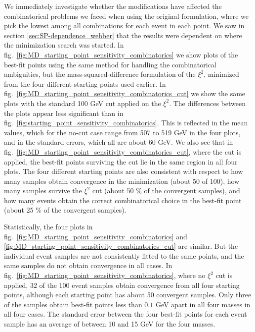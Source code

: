 \documentclass[twoside,english]{uiofysmaster}
\begin{document}
We immediately investigate whether the modifications have affected the combinatorical problems we faced when using the original formulation, where we pick the lowest among all combinations for each event in each point. We saw in section \ref{sec:SP-dependence_webber} that the results were dependent on where the minimization search was started. In fig.\ \ref{fig:MD_starting_point_sensitivity_combinatorics} we show plots of the best-fit points using the same method for handling the combinatorical ambiguities, but the mass-squared-difference formulation of the $\xi^2$, minimized from the four different starting points used earlier. In fig.\ \ref{fig:MD_starting_point_sensitivity_combinatorics_cut} we show the same plots with the standard 100 GeV cut applied on the $\xi^2$. The differences between the plots appear less significant than in fig.\ \ref{fig:starting_point_sensitivity_combinatorics}. This is reflected in the mean values, which for the no-cut case range from 507 to 519 GeV in the four plots, and in the standard errors, which all are about 60 GeV. We also see that in fig.\ \ref{fig:MD_starting_point_sensitivity_combinatorics_cut}, where the cut is applied, the best-fit points surviving the cut lie in the same region in all four plots. The four different starting points are also consistent with respect to how many samples obtain convergence in the minimization (about 50 of 100), how many samples survive the $\xi^2$ cut (about 50 \% of the convergent samples), and how many events obtain the correct combinatorical choice in the best-fit point (about 25 \% of the convergent samples). 

Statistically, the four plots in fig.\ \ref{fig:MD_starting_point_sensitivity_combinatorics} and \ref{fig:MD_starting_point_sensitivity_combinatorics_cut} are similar. But the individual event samples are not consistently fitted to the same points, and the same samples do not obtain convergence in all cases. In fig.\ \ref{fig:MD_starting_point_sensitivity_combinatorics}, where no $\xi^2$ cut is applied, 32 of the 100 event samples obtain convergence from all four starting points, although each starting point has about 50 convergent samples. Only three of the samples obtain best-fit points less than $0.1$ GeV apart in all four masses in all four cases. The standard error between the four best-fit points for each event sample has an average of between 10 and 15 GeV for the four masses.
\end{document}
